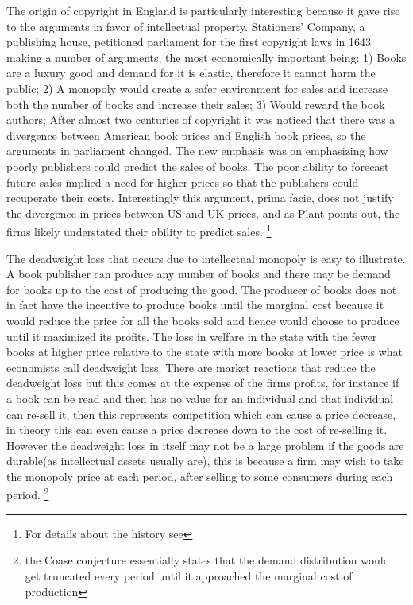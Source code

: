 \documentclass[12pt]{article}
\numberwithin{equation}{section}
\begin{document}
The origin of copyright in England is particularly interesting because it gave rise to the arguments in favor of intellectual property. Stationers' Company, a publishing house, petitioned parliament for the first copyright laws in 1643 making a number of arguments, the most economically important being: 1) Books are a luxury good and demand for it is elastic, therefore it cannot harm the public; 2) A monopoly would create a safer environment for sales and increase both the number of books and increase their sales; 3) Would reward the book authors; After almost two centuries of copyright it was noticed that there was a divergence between American book prices and English book prices, so the arguments in parliament changed. The new emphasis was on emphasizing how poorly publishers could predict the sales of books. The poor ability to forecast future sales implied a need for higher prices so that the publishers could recuperate their costs. Interestingly this argument, prima facie, does  not justify the divergence in prices between US and UK prices, and as Plant points out, the firms likely understated their ability to predict sales. \footnote{For details about the history see\cite{Plant1934}}



The deadweight loss that occurs due to intellectual monopoly is easy to illustrate. A book publisher can produce any number of books and there may be demand for books up to the cost of producing the good. The producer of books does not in fact have the incentive to produce books until the marginal cost because it would reduce the price for all the books sold and hence would choose to produce until it maximized its profits. The loss in welfare in the state with the fewer books at higher price relative to the state with more books at lower price is what economists call deadweight loss. There are market reactions that reduce the deadweight loss but this comes at the expense of the firms profits, for instance if a book can be read and then has no value for an individual and that individual can re-sell it, then this represents competition which can cause a price decrease, in theory this can even cause a price decrease down to the cost of re-selling it. However the deadweight loss in itself may not be a large problem if the goods are durable(as intellectual assets usually are), this is because a firm may wish to take the monopoly price at each period, after selling to some consumers during each period. \footnote{the Coase conjecture essentially states that the demand distribution would get truncated every period until it approached the marginal cost of production}%
\end{document}
